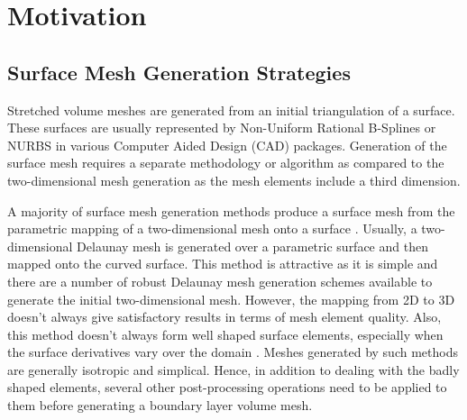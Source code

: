 \section{Motivation}
\label{sec-motivation}

\subsection{Surface Mesh Generation Strategies}

Stretched volume meshes are generated from an initial triangulation of a surface. These surfaces are usually represented by Non-Uniform Rational B-Splines or NURBS in various Computer Aided Design (CAD) packages. Generation of the surface mesh requires a separate methodology or algorithm as compared to the two-dimensional mesh generation as the mesh elements include a third dimension.


A majority of surface mesh generation methods produce a surface mesh from the parametric mapping of a two-dimensional mesh onto a surface \cite{george1998delaunay, chen1997delaunay}. Usually, a two-dimensional Delaunay mesh is generated over a parametric surface and then mapped onto the curved surface. This method is attractive as it is simple and there are a number of robust Delaunay mesh generation schemes available to generate the initial two-dimensional mesh. However, the mapping from 2D to 3D doesn't always give satisfactory results in terms of mesh element quality. Also, this method doesn't always form well shaped surface elements, especially when the surface derivatives vary over the domain \cite{owen1998survey}. Meshes generated by such methods are generally isotropic and simplical. Hence, in addition to dealing with the badly shaped elements, several other post-processing operations need to be applied to them before generating a boundary layer volume mesh.


